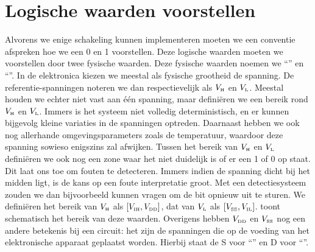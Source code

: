 \section{Logische waarden voorstellen}
\label{s:logischeWaarden}
Alvorens we enige schakeling kunnen implementeren moeten we een conventie afspreken hoe we een 0 en 1 voorstellen. Deze logische waarden moeten we voorstellen door twee fysische waarden. Deze fysische waarden noemen we ``'' en ``''. In de elektronica kiezen we meestal als fysische grootheid de spanning. De referentie-spanningen noteren we dan respectievelijk als $V_{\mbox{\tiny H}}$ en $V_{\mbox{\tiny L}}$. Meestal houden we echter niet vast aan \'e\'en spanning, maar defini\"eren we een bereik rond $V_{\mbox{\tiny H}}$ en $V_{\mbox{\tiny L}}$. Immers is het systeem niet volledig deterministisch, en er kunnen bijgevolg kleine variaties in de spanningen optreden. Daarnaast hebben we ook nog allerhande omgevingsparameters zoals de temperatuur, waardoor deze spanning sowieso enigszins zal afwijken. Tussen het bereik van $V_{\mbox{\tiny H}}$ en $V_{\mbox{\tiny L}}$ defini\"eren we ook nog een zone waar het niet duidelijk is of er een 1 of 0 op staat. Dit laat ons toe om fouten te detecteren. Immers indien de spanning dicht bij het midden ligt, is de kans op een foute interpretatie groot. Met een detectiesysteem zouden we dan bijvoorbeeld kunnen vragen om de bit opnieuw uit te sturen. We defini\"eren het bereik van $V_{\mbox{\tiny H}}$ als $\left[V_{\mbox{\tiny IH}},V_{\mbox{\tiny DD}}\right]$, dat van $V_{\mbox{\tiny L}}$ als $\left[V_{\mbox{\tiny SS}},V_{\mbox{\tiny IL}}\right]$.  toont schematisch het bereik van deze waarden. Overigens hebben $V_{\mbox{\tiny DD}}$ en $V_{\mbox{\tiny SS}}$ nog een andere betekenis bij een circuit: het zijn de spanningen die op de voeding van het elektronische apparaat geplaatst worden. Hierbij staat de S voor ``'' en D voor ``''.

